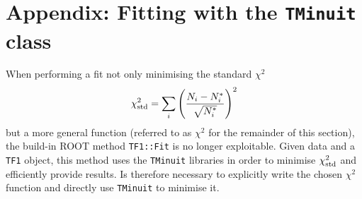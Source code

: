 

\section[Appendix]{Appendix: Fitting with the \texttt{TMinuit} class}
	When performing a fit not only minimising the standard $\chi^2$
	\[
		\chi^2_\textup{std}=\sum_i \left(\frac{N_i-N_i^*}{\sqrt{N_i^*}}\right)^2
	\]
	but a more general function (referred to as $\chi^2$ for the remainder of this section), the build-in ROOT method \texttt{TF1::Fit} is no longer exploitable. Given data and a \texttt{TF1} object, this method uses the \texttt{TMinuit} libraries in order to minimise $\chi^2_\textup{std}$ and efficiently provide results. Is therefore necessary to explicitly write the chosen $\chi^2$ function and directly use \texttt{TMinuit} to minimise it.
	
